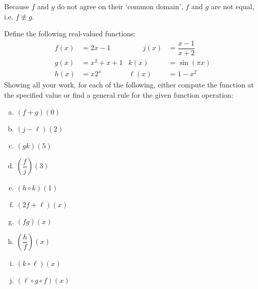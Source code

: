 \documentclass[11pt,letterpaper]{article}
\begin{document}
Because $f$ and $g$ do not agree on their `common domain', $f$ and $g$ are not equal, i.e. $f \not\equiv g$. 



\newpage



 Define the following real-valued functions:
	\[
	\begin{aligned}
	f(x)&= 2x - 1 &\qquad j(x)&= \dfrac{x - 1}{x + 2} \\
	g(x)&= x^2 + x + 1 & k(x)&= \sin(\pi x) \\
	h(x)&= x 2^x & \ell(x)&= 1 - x^2
	\end{aligned}
	\]
Showing all your work, for each of the following, either compute the function at the specified value or find a general rule for the given function operation:
	\begin{enumerate}[(a)]
	\item $(f + g)(0)$
	\item $(j - \ell)(2)$
	\item $(gk)(5)$
	\item $\left( \dfrac{f}{j} \right) (3)$
	\item $(h \circ k)(1)$
	\item $(2f + \ell)(x)$
	\item $(fg)(x)$
	\item $\left( \dfrac{h}{f} \right)(x)$
	\item $(k \circ \ell)(x)$
	\item $(\ell \circ g \circ f)(x)$
	\end{enumerate} \pspace

\sol
\end{document}
